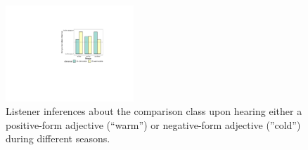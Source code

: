 \documentclass[letterpaper, 12pt]{article}
\begin{document}
\begin{figure}
\vspace{-1cm}
  \begin{center}
    \includegraphics[width=0.43\textwidth]{L1preds}
  \end{center}
  \vspace{-0.45cm}
  \caption{\small 
Listener inferences about the comparison class  upon  hearing either a positive-form adjective (``warm'') or negative-form adjective (''cold'') during different seasons. 
  }
  \vspace{-0.55cm}
  \label{fig:predictions}
\end{figure}
\end{document}
